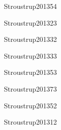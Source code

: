 \begin{syllabus}
   \begin{unit}{\SDFAlgorithmsandDesign}{}{Stroustrup2013}{5}{4}
      \SDFAlgorithmsandDesignAllTopics
      \SDFAlgorithmsandDesignAllLearningOutcomes
   \end{unit}
   
   \begin{unit}{\PLEventDrivenandReactiveProgramming}{}{Stroustrup2013}{2}{3}
      \PLEventDrivenandReactiveProgrammingAllTopics
      \PLEventDrivenandReactiveProgrammingAllLearningOutcomes
   \end{unit}
   
   \begin{unit}{\ALBasicAnalysis}{}{Stroustrup2013}{3}{2}
         \ALBasicAnalysisAllTopics
         \ALBasicAnalysisAllLearningOutcomes      
   \end{unit}
   
   \begin{unit}{\ALFundamentalDataStructuresandAlgorithms}{}{Stroustrup2013}{3}{3}
      \ALFundamentalDataStructuresandAlgorithmsAllTopics
      \ALFundamentalDataStructuresandAlgorithmsAllLearningOutcomes
   \end{unit}
   
   \begin{unit}{\OSOperatingSystemPrinciples}{}{Stroustrup2013}{5}{3}
      \OSOperatingSystemPrinciplesAllTopics
      \OSOperatingSystemPrinciplesAllLearningOutcomes
   \end{unit}
   
   \begin{unit}{\PLObjectOrientedProgramming}{}{Stroustrup2013}{7}{3}
      \PLObjectOrientedProgrammingAllTopics
      \PLObjectOrientedProgrammingAllLearningOutcome
   \end{unit}
   
   \begin{unit}{\SESoftwareDesign}{}{Stroustrup2013}{5}{2}
      \SESoftwareDesignAllTopics
      \SESoftwareDesignAllLearningOutcomes
   \end{unit}
   
   
   \begin{unit}{\SERequirementsEngineering}{}{Stroustrup2013}{1}{2}
      \SERequirementsEngineeringAllTopics
      \SERequirementsEngineeringAllLearningOutcomes
   \end{unit}
   
   \begin{coursebibliography}
   \end{coursebibliography}
   
   \end{syllabus}
   
   
